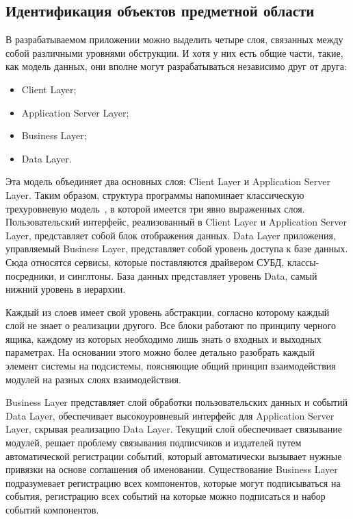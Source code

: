 \subsection{Идентификация объектов предметной области}
\label{sub:domain:object}

В разрабатываемом приложении можно выделить четыре слоя, связанных между собой различными уровнями обструкции. И хотя у них есть общие части, такие, как модель данных, они вполне могут разрабатываться независимо друг от друга:
\begin{itemize}
  \item Client Layer;
  \item Application Server Layer;
  \item Business Layer;
  \item Data Layer.
\end{itemize}

Эта модель объединяет два основных слоя: Client Layer и \foreignlanguage{english}{Application Server Layer}. Таким образом, структура программы напоминает классическую трехуровневую модель~\cite[с.~308\,--\,401]{sicp_2006_ru}, в которой имеется три явно выраженных слоя. Пользовательский интерфейс, реализованный в Client Layer и \foreignlanguage{english}{Application Server Layer}, представляет собой блок отображения данных. Data Layer приложения, управляемый Business Layer, представляет собой уровень доступа к базе данных. Сюда относятся сервисы, которые поставляются драйвером СУБД, классы-посредники, и синглтоны. База данных представляет уровень Data, самый нижний уровень в иерархии.

Каждый из слоев имеет свой уровень абстракции, согласно которому каждый слой не знает о реализации другого. Все блоки работают по принципу черного ящика, каждому из которых необходимо лишь знать о входных и выходных параметрах. На основании этого можно более детально разобрать каждый элемент системы на подсистемы, поясняющие общий принцип взаимодействия модулей на разных слоях взаимодействия.

Business Layer представляет слой обработки пользовательских данных и событий Data Layer, обеспечивает высокоуровневый интерфейс для \foreignlanguage{english}{Application Server Layer}, скрывая реализацию Data Layer. Текущий слой обеспечивает связывание модулей, решает проблему связывания подписчиков и издателей путем автоматической регистрации событий, который автоматически вызывает нужные привязки на основе соглашения об именовании.
Существование Business Layer подразумевает регистрацию всех компонентов, которые могут подписываться на события, регистрацию всех событий на которые можно подписаться и набор событий компонентов.

